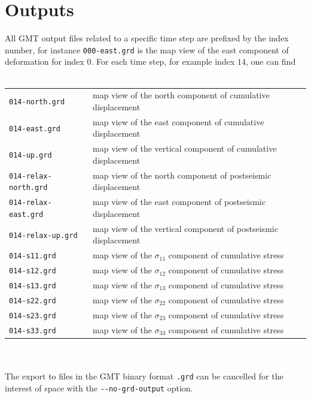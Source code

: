 \documentclass[10pt]{article}
\begin{document}
\pagebreak
\section{Outputs}

All GMT output files related to a specific time step are prefixed by the index number, for instance \verb'000-east.grd' is the map view of the east component of deformation for index $0$. For each time step, for example index $14$, one can find\\
\\
\begin{tabular}{ll}
\verb'014-north.grd' & map view of the north component of cumulative displacement\\
\verb'014-east.grd' & map view of the east component of cumulative displacement\\
\verb'014-up.grd' & map view of the vertical component of cumulative displacement\\
\verb'014-relax-north.grd' & map view of the north component of postseismic displacement\\
\verb'014-relax-east.grd' & map view of the east component of postseismic displacement\\
\verb'014-relax-up.grd' & map view of the vertical component of postseismic displacement\\
\verb'014-s11.grd' & map view of the $\sigma_{11}$ component of cumulative stress\\
\verb'014-s12.grd' & map view of the $\sigma_{12}$ component of cumulative stress\\
\verb'014-s13.grd' & map view of the $\sigma_{13}$ component of cumulative stress\\
\verb'014-s22.grd' & map view of the $\sigma_{22}$ component of cumulative stress\\
\verb'014-s23.grd' & map view of the $\sigma_{23}$ component of cumulative stress\\
\verb'014-s33.grd' & map view of the $\sigma_{33}$ component of cumulative stress\\
\end{tabular}\\
\\
The export to files in the GMT binary format \verb'.grd' can be cancelled for the interest of space with the \verb'--no-grd-output' option.
\end{document}
